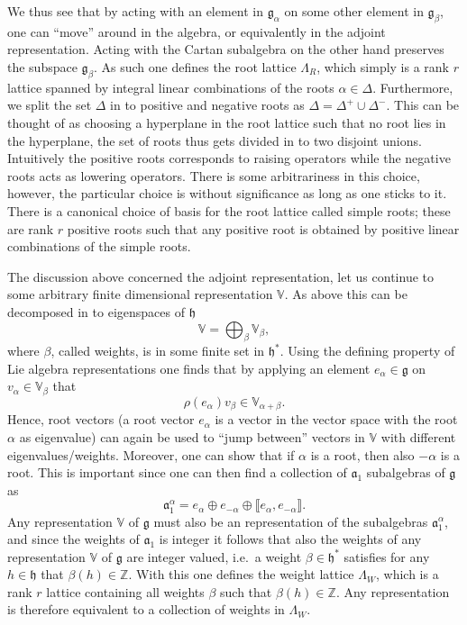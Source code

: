 \documentclass[11pt]{report}
\begin{document}
We thus see that by acting with an element in $\mathfrak{g}_\alpha$ on some other element in $\mathfrak{g}_\beta$, one can ``move'' around in the algebra, or equivalently in the adjoint representation. Acting with the Cartan subalgebra on the other hand preserves the subspace $\mathfrak{g}_\beta$. As such one defines the root lattice $\Lambda_R$, which simply is a rank $r$ lattice spanned by integral linear combinations of the roots $\alpha\in\Delta$. Furthermore, we split the set $\Delta$ in to positive and negative roots as $\Delta = \Delta^+\cup\Delta^-$. This can be thought of as choosing a hyperplane in the root lattice such that no root lies in the hyperplane, the set of roots thus gets divided in to two disjoint unions. Intuitively the positive roots corresponds to raising operators while the negative roots acts as lowering operators. There is some arbitrariness in this choice, however, the particular choice is without significance as long as one sticks to it. There is a canonical choice of basis for the root lattice called simple roots; these are rank $r$ positive roots such that any positive root is obtained by positive linear combinations of the simple roots. 

The discussion above concerned the adjoint representation, let us continue to some arbitrary finite dimensional representation $\mathbb{V}$. As above this can be decomposed in to eigenspaces of $\mathfrak{h}$
\begin{equation}
    \mathbb{V} = \bigoplus_\beta \mathbb{V}_\beta,
\end{equation}
where $\beta$, called weights, is in some finite set in $\mathfrak{h}^*$. Using the defining property of Lie algebra representations one finds that by applying an element $e_\alpha\in\mathfrak{g}$ on $v_\alpha\in\mathbb{V}_\beta$ that 
\begin{equation}
    \rho(e_\alpha)v_\beta \in \mathbb{V}_{\alpha+\beta}.
\end{equation}
Hence, root vectors (a root vector $e_\alpha$ is a vector in the vector space with the root $\alpha$ as eigenvalue) can again be used to ``jump between'' vectors in $\mathbb{V}$ with different eigenvalues/weights. Moreover, one can show that if $\alpha$ is a root, then also $-\alpha$ is a root. This is important since one can then find a collection of $\mathfrak{a}_1$ subalgebras of $\mathfrak{g}$ as 
\begin{equation}
    \mathfrak{a}_1^\alpha = e_\alpha \oplus e_{-\alpha} \oplus \llbracket e_\alpha,e_{-\alpha}\rrbracket.
\end{equation}
Any representation $\mathbb{V}$ of $\mathfrak{g}$ must also be an representation of the subalgebras $\mathfrak{a}_1^\alpha$, and since the weights of $\mathfrak{a}_1$ is integer it follows that also the weights of any representation $\mathbb{V}$ of $\mathfrak{g}$ are integer valued, i.e.\ a weight $\beta\in\mathfrak{h}^*$ satisfies for any $h\in\mathfrak{h}$ that $\beta(h)\in\mathbb{Z}$. With this one defines the weight lattice $\Lambda_W$, which is a rank $r$ lattice containing all weights $\beta$ such that $\beta(h)\in\mathbb{Z}$. Any representation is therefore equivalent to a collection of weights in $\Lambda_W$. 
\end{document}
